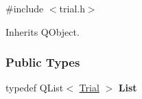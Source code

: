 \hypertarget{classapex_1_1data_1_1_trial}{
\label{classapex_1_1data_1_1_trial}
}


{\ttfamily \#include $<$trial.\-h$>$}



Inherits Q\-Object.

\subsubsection*{Public Types}
\begin{DoxyCompactItemize}
\item
\hypertarget{classapex_1_1data_1_1_trial_afaa9b98e9c2ae19213d5a9dfb723a6f8}{typedef Q\-List$<$ \hyperlink{classapex_1_1data_1_1_trial}{Trial} $>$ {\bfseries List}}\label{classapex_1_1data_1_1_trial_afaa9b98e9c2ae19213d5a9dfb723a6f8}

\end{DoxyCompactItemize}
